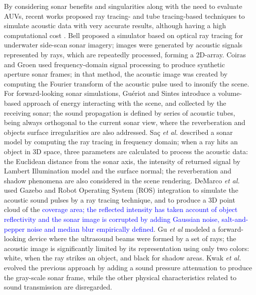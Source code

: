 \documentclass[final,5p,times]{elsarticle}
\begin{document}
By considering sonar benefits and singularities along with the need to
evaluate AUVs, recent works proposed ray tracing- and tube tracing-based
techniques to simulate acoustic data with very accurate results, although
having a high computational cost
\cite{bell1997,coiras2009,gueriot2010,sac2015,demarco2015,gu2013,kwak2015}.
Bell \cite{bell1997} proposed a simulator based on optical ray tracing for
underwater side-scan sonar imagery; images were generated by acoustic
signals represented by rays, which are repeatedly processed, forming a
2D-array. Coiras and Groen \cite{coiras2009} used frequency-domain
signal processing to produce synthetic aperture sonar frames; in that method,
the acoustic image was created by computing the Fourier transform of the
acoustic pulse used to insonify the scene. For forward-looking sonar
simulations, Guériot and Sintes \cite{gueriot2010} introduce a volume-based
approach of energy interacting with the scene, and collected by the receiving
sonar; the sound propagation is defined by series of acoustic tubes, being
always orthogonal to the current sonar view, where the reverberation and
objects surface irregularities are also addressed. Saç \textit{et al.}
\cite{sac2015} described a sonar model by computing the ray tracing in
frequency domain; when a ray hits an object in 3D space, three parameters
are calculated to process the acoustic data: the Euclidean distance from
the sonar axis, the intensity of returned signal by Lambert Illumination
model and the surface normal; the reverberation and shadow phenomena are
also considered in the scene rendering. DeMarco \textit{et al.}
\cite{demarco2015} used Gazebo and Robot Operating System (ROS)
\cite{quigley2009} integration to simulate the acoustic sound pulses by a
ray tracing technique, and to produce a 3D point cloud of the \textcolor{blue}{coverage area;
the reflected intensity has taken account of object reflectivity and the
sonar image is corrupted by adding Gaussian noise, salt-and-pepper noise
and median blur empirically defined}. Gu \textit{et al} \cite{gu2013} modeled
a forward-looking device where the ultrasound beams were formed by a set of
rays; the acoustic image is significantly limited by its representation
using only two colors: white, when the ray strikes an object, and black for
shadow areas. Kwak \textit{et al.} \cite{kwak2015} evolved the previous
approach by adding a sound pressure attenuation to produce the gray-scale
sonar frame, while the other physical characteristics related to sound
transmission are disregarded.
\end{document}
